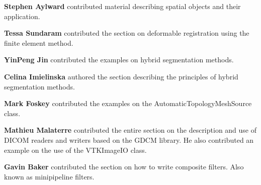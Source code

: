 {\bf Stephen Aylward} contributed material describing spatial objects and
their application.

{\bf Tessa Sundaram} contributed the section on deformable registration using
the finite element method.

{\bf YinPeng Jin} contributed the examples on  hybrid segmentation methods. 

{\bf Celina Imielinska} authored the section describing the principles of
hybrid segmentation methods.

{\bf Mark Foskey} contributed the examples on the
AutomaticTopologyMeshSource class.

{\bf Mathieu Malaterre} contributed the entire section on the description and
use of DICOM readers and writers based on the GDCM library. He also contributed
an example on the use of the VTKImageIO class.

{\bf Gavin Baker} contributed the section on how to write composite filters.
Also known as minipipeline filters.



